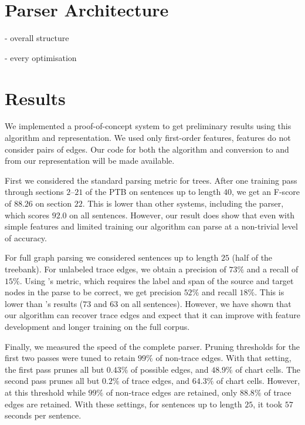 \section{Parser Architecture}

- overall structure

- every optimisation

\section{Results}

We implemented a proof-of-concept system to get preliminary results using this algorithm and representation.
We used only first-order features, \ie features do not consider pairs of edges.
Our code for both the algorithm and conversion to and from our representation will be made available.

First we considered the standard parsing metric for trees.
After one training pass through sections $2$--$21$ of the PTB on sentences up to length $40$, we get an F-score of $88.26$ on section $22$.
This is lower than other systems, including the \textcite{cck} parser, which scores $92.0$ on all sentences.
However, our result does show that even with simple features and limited training our algorithm can parse at a non-trivial level of accuracy.

For full graph parsing we considered sentences up to length $25$ (half of the treebank).
For unlabeled trace edges, we obtain a precision of $73\%$ and a recall of $15\%$.
Using \textcite{Johnson:2002}'s metric, which requires the label and span of the source and target nodes in the parse to be correct, we get precision $52\%$ and recall $18\%$.
This is lower than \textcite{Johnson:2002}'s results ($73$ and $63$ on all sentences).
However, we have shown that our algorithm can recover trace edges and expect that it can improve with feature development and longer training on the full corpus.

Finally, we measured the speed of the complete parser.
Pruning thresholds for the first two passes were tuned to retain $99\%$ of non-trace edges.
With that setting, the first pass prunes all but $0.43\%$ of possible edges, and $48.9\%$ of chart cells.
The second pass prunes all but $0.2\%$ of trace edges, and $64.3\%$ of chart cells.
However, at this threshold while $99\%$ of non-trace edges are retained, only $88.8\%$ of trace edges are retained.
With these settings, for sentences up to length $25$, it took $57$ seconds per sentence.

